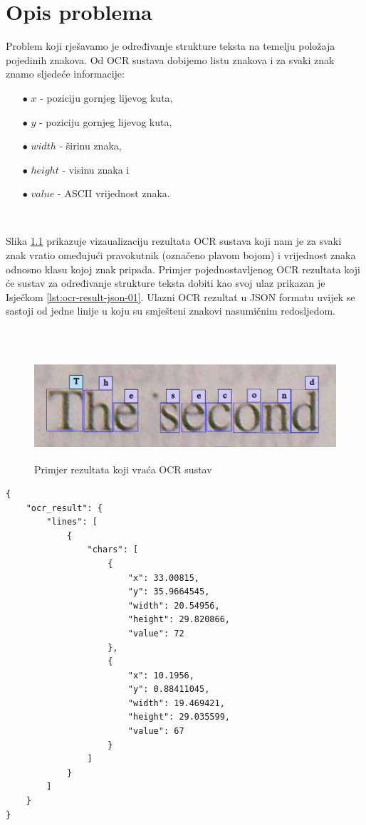 \documentclass[times, utf8, zavrsni]{fer}
\begin{document}
\chapter{Opis problema}
Problem koji rješavamo je određivanje strukture teksta na temelju položaja pojedinih znakova.
Od OCR sustava dobijemo listu znakova i za svaki znak znamo sljedeće informacije:
\begin{itemize}
    \item[$\bullet$] $x$ - poziciju gornjeg lijevog kuta,
    \item[$\bullet$] $y$ - poziciju gornjeg lijevog kuta,
    \item[$\bullet$] $width$ - širinu znaka,
    \item[$\bullet$] $height$ - visinu znaka i
    \item[$\bullet$] $value$ - ASCII vrijednost znaka.
\end{itemize}

\

Slika \ref{fig:book-example-02} prikazuje vizaualizaciju rezultata OCR sustava koji nam je za svaki
znak vratio omeđujući pravokutnik (označeno plavom bojom) i vrijednost znaka odnosno klasu kojoj
znak pripada.
Primjer pojednostavljenog OCR rezultata koji će sustav za određivanje strukture teksta dobiti kao svoj
ulaz prikazan je Isječkom \ref{lst:ocr-result-json-01}. Ulazni OCR rezultat u JSON formatu uvijek se sastoji
od jedne linije u koju su smješteni znakovi nasumičnim redosljedom.

\

\begin{figure}[htb]
    \centering
    \includegraphics[height=4cm]{images/book-example-02.png}
    \caption{Primjer rezultata koji vraća OCR sustav}
    \label{fig:book-example-02}
\end{figure}

\pagebreak

\begin{lstlisting}[frame=single,caption={Rezultat OCR-a u JSON formatu},label={lst:ocr-result-json-01},language=HTML]
{
    "ocr_result": {
        "lines": [
            {
                "chars": [
                    {
                        "x": 33.00815,
                        "y": 35.9664545,
                        "width": 20.54956,
                        "height": 29.820866,
                        "value": 72
                    },
                    {
                        "x": 10.1956,
                        "y": 0.88411045,
                        "width": 19.469421,
                        "height": 29.035599,
                        "value": 67
                    }
                ]
            }
        ]
    }
}
\end{lstlisting}
\end{document}
